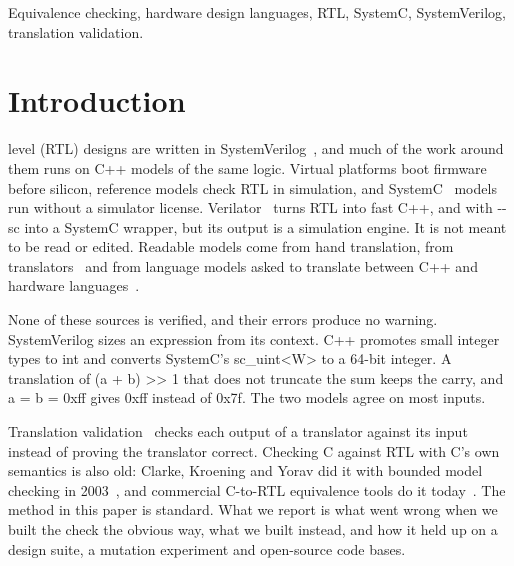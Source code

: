 \documentclass{ieeeaccess}
\newcommand{\code}[1]{{\fontshape{n}\ttfamily #1}}
\begin{document}
\begin{keywords}
Equivalence checking, hardware design languages, RTL, SystemC, SystemVerilog, translation
validation.
\end{keywords}

\titlepgskip=-21pt

\maketitle

\section{Introduction}
\label{sec:intro}

 level (RTL) designs are written in SystemVerilog~\cite{ieee1800_2023}, and much of the work around them runs on
C++ models of the same logic. Virtual platforms boot firmware before silicon, reference models
check RTL in simulation, and SystemC~\cite{ieee1666_2023} models run without a simulator license.
Verilator~\cite{snyder2020verilator} turns RTL into fast C++, and with \code{-{}-sc} into a SystemC
wrapper, but its output is a simulation engine. It is not meant to be read or edited. Readable models come
from hand translation, from translators~\cite{bombieri2010hifsuite,syed2013vhdl2sc,zheng2026bidir}
and from language models asked to translate between C++ and hardware
languages~\cite{collini2024c2hlsc,lyu2026autoc2v}.

None of these sources is verified, and their errors produce no warning. SystemVerilog sizes an
expression from its context. C++ promotes small integer types to \code{int} and converts SystemC's
\code{sc\_uint<W>} to a 64-bit integer. A translation of \code{(a + b) {>}{>} 1} that does not truncate
the sum keeps the carry, and \code{a = b = 0xff} gives \code{0xff} instead of \code{0x7f}. The
two models agree on most inputs.

Translation validation~\cite{pnueli1998tv,necula2000tv,lopes2021alive2} checks each output of a
translator against its input instead of proving the translator correct. Checking C against RTL
with C's own semantics is also old: Clarke, Kroening and Yorav did it with bounded model checking
in 2003~\cite{clarke2003cverilog}, and commercial C-to-RTL equivalence tools do it
today~\cite{koelbl2009c2rtl}. The method in this paper is standard. What we report is what went
wrong when we built the check the obvious way, what we built instead, and how it held up on a
design suite, a mutation experiment and \nCodeBases{} open-source code bases.
\end{document}
